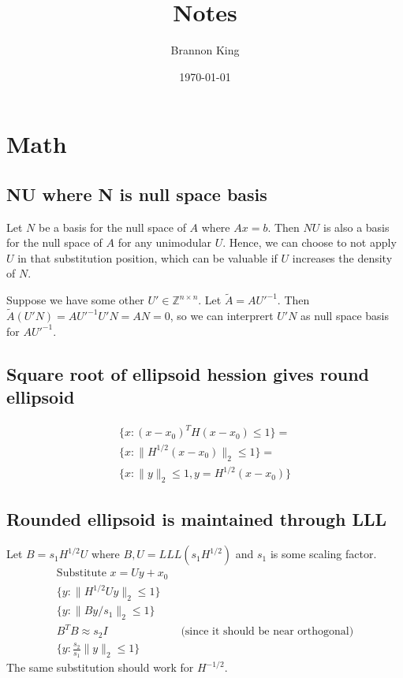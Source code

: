 \documentclass[11pt]{article}
\title{Notes}
\author{Brannon King}
\date{\today}
\theoremstyle{definition}
\theoremstyle{remark}
\begin{document}
\maketitle

\section{Math}

\subsection{NU where N is null space basis}
Let $N$ be a basis for the null space of $A$ where $Ax=b$.
Then $NU$ is also a basis for the null space of $A$ for any unimodular $U$.
Hence, we can choose to not apply $U$ in that substitution position,
which can be valuable if $U$ increases the density of $N$.

Suppose we have some other $U' \in \mathbb{Z}^{n \times n}$. Let $\tilde{A}= AU'^{-1}$.
Then
$\tilde{A} (U' N) = A U'^{-1} U' N = A N = 0$, so we can interprert $U'N$ as null space basis for $AU'^{-1}$.

\subsection{Square root of ellipsoid hession gives round ellipsoid}

\begin{align}
\{x : (x - x_0)^T H (x - x_0) \leq 1 \} = \\
\{x : \| H^{1/2} (x - x_0) \|_2 \leq 1 \} = \\
\{x : \| y \|_2 \leq 1, y = H^{1/2} (x - x_0) \}
\end{align}

\subsection{Rounded ellipsoid is maintained through LLL}
Let $B=s_1 H^{1/2} U$ where $B,U=LLL(s_1 H^{1/2})$ and $s_1$ is some scaling factor.
\begin{align}
    \text{Substitute } x = Uy + x_0 \\
    \{y : \| H^{1/2} U y \|_2 \leq 1 \} \\
    \{y : \| B y / s_1 \|_2 \leq 1 \} \\
    B^T B \approx s_2 I & \text{ (since it should be near orthogonal)} \\
    \{y : \frac{s_2}{s_1} \| y \|_2 \leq 1 \}
\end{align}
The same substitution should work for $H^{-1/2}$.
\end{document}
